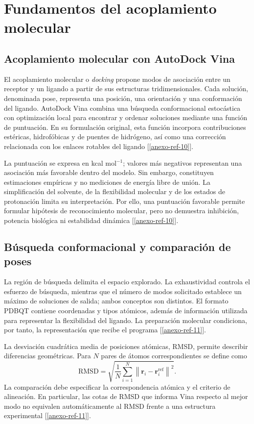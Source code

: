 \chapter{Fundamentos del acoplamiento molecular}
\label{ap:acoplamiento}

\section{Acoplamiento molecular con AutoDock Vina}
El acoplamiento molecular o \textit{docking} propone modos de asociación entre un receptor y un ligando a partir de sus estructuras tridimensionales. Cada solución, denominada pose, representa una posición, una orientación y una conformación del ligando. AutoDock Vina combina una búsqueda conformacional estocástica con optimización local para encontrar y ordenar soluciones mediante una función de puntuación. En su formulación original, esta función incorpora contribuciones estéricas, hidrofóbicas y de puentes de hidrógeno, así como una corrección relacionada con los enlaces rotables del ligando [\ref{anexo-ref-10}].

La puntuación se expresa en kcal mol$^{-1}$; valores más negativos representan una asociación más favorable dentro del modelo. Sin embargo, constituyen estimaciones empíricas y no mediciones de energía libre de unión. La simplificación del solvente, de la flexibilidad molecular y de los estados de protonación limita su interpretación. Por ello, una puntuación favorable permite formular hipótesis de reconocimiento molecular, pero no demuestra inhibición, potencia biológica ni estabilidad dinámica [\ref{anexo-ref-10}].

\section{Búsqueda conformacional y comparación de poses}
La región de búsqueda delimita el espacio explorado. La exhaustividad controla el esfuerzo de búsqueda, mientras que el número de modos solicitado establece un máximo de soluciones de salida; ambos conceptos son distintos. El formato PDBQT contiene coordenadas y tipos atómicos, además de información utilizada para representar la flexibilidad del ligando. La preparación molecular condiciona, por tanto, la representación que recibe el programa [\ref{anexo-ref-11}].

La desviación cuadrática media de posiciones atómicas, RMSD, permite describir diferencias geométricas. Para $N$ pares de átomos correspondientes se define como
\begin{equation}
 \mathrm{RMSD}=\sqrt{\frac{1}{N}\sum_{i=1}^{N}\left\|\mathbf r_i-\mathbf r_i^{\mathrm{ref}}\right\|^2}.
\end{equation}
La comparación debe especificar la correspondencia atómica y el criterio de alineación. En particular, las cotas de RMSD que informa Vina respecto al mejor modo no equivalen automáticamente al RMSD frente a una estructura experimental [\ref{anexo-ref-11}].

